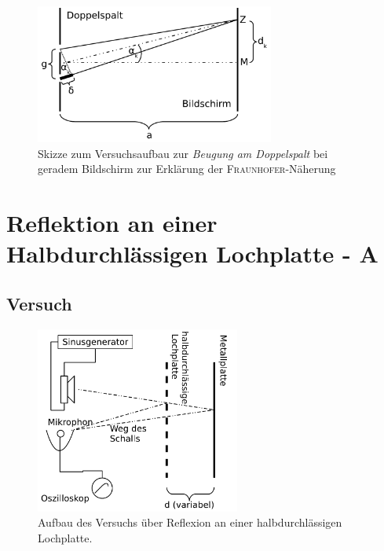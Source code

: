  



\begin{figure}
 \centering
 \includegraphics[width=0.7\textwidth]{praktika/mat_praktika/beugung_aufbau01}
 	\caption{Skizze zum Versuchsaufbau zur \emph{Beugung am Doppelspalt} bei geradem Bildschirm zur Erklärung der \textsc{Fraunhofer}-Näherung}
 		\label{img_beugungamdoppelspalt_p}
\end{figure}












\section{Reflektion an einer Halbdurchlässigen Lochplatte - A}


\subsection{Versuch}
\label{kap_reflexion01}

\begin{figure}
	\centering
   \includegraphics[width=0.6\textwidth]{praktika/mat_praktika/lochplatte}
   \caption{Aufbau des Versuchs über Reflexion an einer halbdurchlässigen Lochplatte.}
   \label{img_aufbau_lochplatte}
\end{figure}


